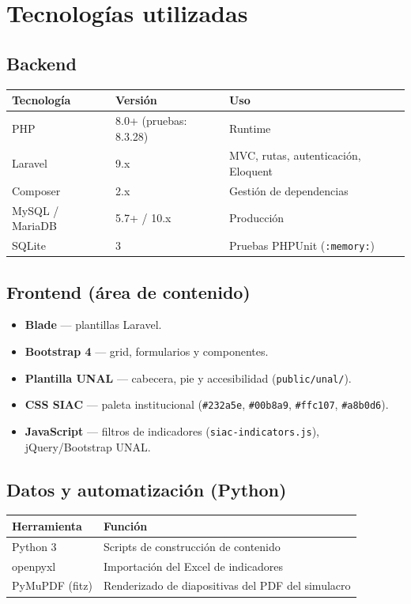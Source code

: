 \chapter{Tecnologías utilizadas}

\section{Backend}
\begin{table}[H]
  \centering
  \begin{tabular}{@{}lll@{}}
    \toprule
    \textbf{Tecnología} & \textbf{Versión} & \textbf{Uso} \\
    \midrule
    PHP & 8.0+ (pruebas: 8.3.28) & Runtime \\
    Laravel & 9.x & MVC, rutas, autenticación, Eloquent \\
    Composer & 2.x & Gestión de dependencias \\
    MySQL / MariaDB & 5.7+ / 10.x & Producción \\
    SQLite & 3 & Pruebas PHPUnit (\texttt{:memory:}) \\
    \bottomrule
  \end{tabular}
\end{table}

\section{Frontend (área de contenido)}
\begin{itemize}
  \item \textbf{Blade} --- plantillas Laravel.
  \item \textbf{Bootstrap 4} --- grid, formularios y componentes.
  \item \textbf{Plantilla UNAL} --- cabecera, pie y accesibilidad (\texttt{public/unal/}).
  \item \textbf{CSS SIAC} --- paleta institucional (\texttt{\#232a5e}, \texttt{\#00b8a9}, \texttt{\#ffc107}, \texttt{\#a8b0d6}).
  \item \textbf{JavaScript} --- filtros de indicadores (\texttt{siac-indicators.js}), jQuery/Bootstrap UNAL.
\end{itemize}

\section{Datos y automatización (Python)}
\begin{table}[H]
  \centering
  \begin{tabular}{@{}ll@{}}
    \toprule
    \textbf{Herramienta} & \textbf{Función} \\
    \midrule
    Python 3 & Scripts de construcción de contenido \\
    openpyxl & Importación del Excel de indicadores \\
    PyMuPDF (fitz) & Renderizado de diapositivas del PDF del simulacro \\
    \bottomrule
  \end{tabular}
\end{table}

